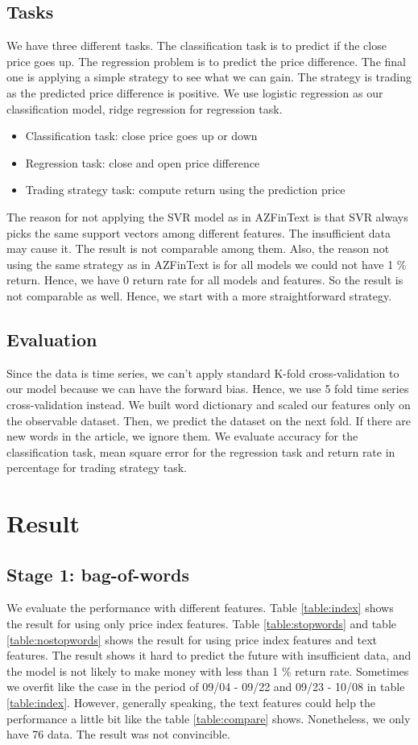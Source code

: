 \documentclass[sigconf]{acmart}
\begin{document}
\subsection{Tasks}
We have three different tasks. The classification task is to predict if the close price goes up. The regression problem is to predict the price difference. The final one is applying a simple strategy to see what we can
gain. The strategy is trading as the predicted price difference is positive. We use logistic regression as our classification model, ridge regression for regression task.
\begin{itemize}
	\item Classification task: close price goes up or down
	\item Regression task: close and open price difference
	\item Trading strategy task: compute return using the prediction price
\end{itemize} 
The reason for not applying the SVR model as in AZFinText is that SVR always picks the same support vectors among different features. The insufficient data may cause it.
The result is not comparable among them. Also, the reason not using the same strategy as in AZFinText is for all models we could not have 1 \% return. Hence, we have 0 return rate for all models and features.
So the result is not comparable as well. Hence, we start with a more straightforward strategy.

\subsection{Evaluation}
Since the data is time series, we can't apply standard K-fold cross-validation to our model because we can have the forward bias. Hence, we use 5 fold time series cross-validation instead. We built word
dictionary and scaled our features only on the observable dataset. Then, we predict the dataset on the next fold. If there are new words in the article, we ignore them.
We evaluate accuracy for the classification task, mean square error for the regression task and return rate in percentage for trading strategy task.

\section{Result}
\subsection{Stage 1: bag-of-words}
We evaluate the performance with different features. Table \ref{table:index} shows the result for using only price index features. Table \ref{table:stopwords} and table \ref{table:nostopwords} shows the result
for using price index features and text features. The result shows it hard to predict the future with insufficient data, and the model is not likely to make money with less than 1 \% return rate. Sometimes we overfit like the case in
the period of 09/04 - 09/22 and 09/23 - 10/08 in table \ref{table:index}. However, generally speaking, the text features could help the performance a little bit like the table \ref{table:compare} shows.
Nonetheless, we only have 76 data. The result was not convincible.
\end{document}
